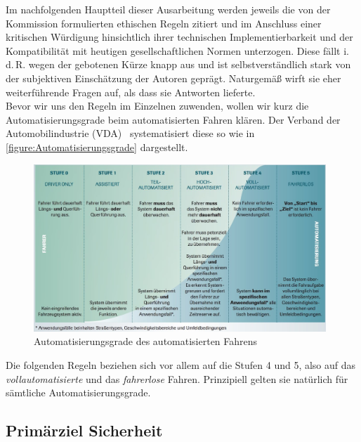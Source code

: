 \documentclass[twoside,a4paper,12pt]{article}
\begin{document}
Im nachfolgenden Hauptteil dieser Ausarbeitung werden jeweils die von der Kommission formulierten ethischen Regeln zitiert und im Anschluss einer kritischen 
Würdigung hinsichtlich ihrer technischen Implementierbarkeit und der Kompatibilität mit heutigen gesellschaftlichen Normen unterzogen. 
Diese fällt i.\,d.\,R. wegen der gebotenen Kürze knapp aus und ist selbstverständlich
stark von der subjektiven Einschätzung der Autoren geprägt. Naturgemäß wirft sie eher weiterführende Fragen auf, als dass sie Antworten lieferte.\\

Bevor wir uns den Regeln im Einzelnen zuwenden, wollen wir kurz die Automatisierungsgrade beim automatisierten Fahren klären. Der Verband der 
Automobilindustrie (VDA)~\cite{vda} systematisiert diese so wie in \autoref{figure:Automatisierungsgrade} dargestellt.\\

\begin{figure}[H]
\centering
\includegraphics[width=11cm]{resources/uebersicht-stufen-der-automatisierung.jpg}
\caption[Automatisierungsgrade des automatisierten Fahrens]{Automatisierungsgrade des automatisierten Fahrens~\cite{vda}}
\label{figure:Automatisierungsgrade}
\end{figure}

Die folgenden Regeln beziehen sich vor allem auf die Stufen 4 und 5, also auf das \textit{vollautomatisierte} und das \textit{fahrerlose} Fahren.
Prinzipiell gelten sie natürlich für sämtliche Automatisierungsgrade.

\subsection{Primärziel Sicherheit} \label{PrimaerzielSicherheit}
\end{document}
